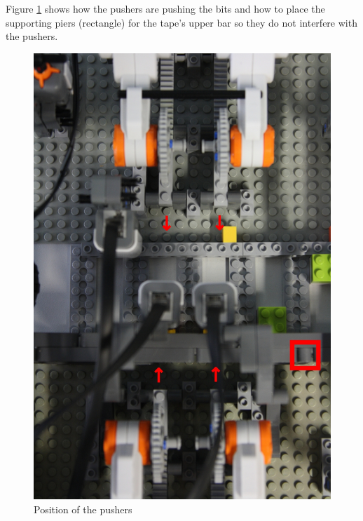 \documentclass[%
  a4paper,%
  11pt,%
  blue,%
  hyperref	%
  ]{tubsartcl}
\begin{document}
\clearpage

Figure \ref{pic:topview_pushers} shows how the pushers are pushing the bits and how to place the supporting piers (rectangle) for the tape's upper bar so they do not interfere with the pushers.

\begin{figure}[!htb]
\begin{center}
\includegraphics[scale=0.35]{graphics_lego/topview_pushers.jpg}
\end{center}
\caption{Position of the pushers}
\label{pic:topview_pushers}
\end{figure}


\makebackpage[trisec]%
\end{document}
